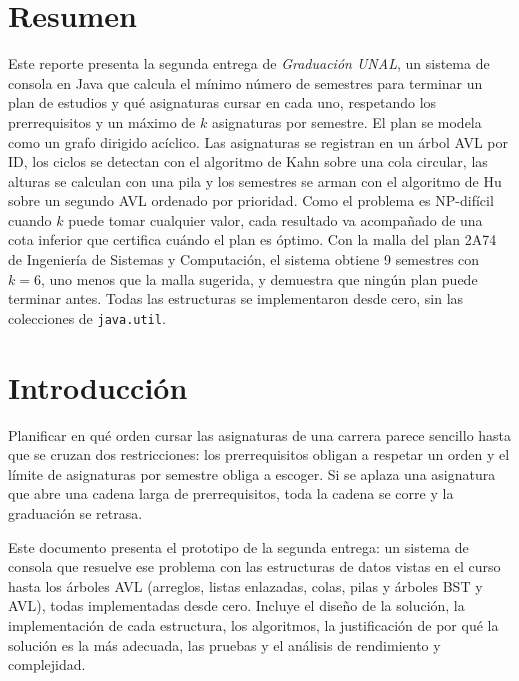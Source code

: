\documentclass[11pt,letterpaper]{article}
\begin{document}
\section*{Resumen}
Este reporte presenta la segunda entrega de \emph{Graduación UNAL}, un sistema de consola en Java que calcula el mínimo número de semestres para terminar un plan de estudios y qué asignaturas cursar en cada uno, respetando los prerrequisitos y un máximo de $k$ asignaturas por semestre. El plan se modela como un grafo dirigido acíclico. Las asignaturas se registran en un árbol AVL por ID, los ciclos se detectan con el algoritmo de Kahn sobre una cola circular, las alturas se calculan con una pila y los semestres se arman con el algoritmo de Hu sobre un segundo AVL ordenado por prioridad. Como el problema es NP-difícil cuando $k$ puede tomar cualquier valor, cada resultado va acompañado de una cota inferior que certifica cuándo el plan es óptimo. Con la malla del plan 2A74 de Ingeniería de Sistemas y Computación, el sistema obtiene 9 semestres con $k = 6$, uno menos que la malla sugerida, y demuestra que ningún plan puede terminar antes. Todas las estructuras se implementaron desde cero, sin las colecciones de \texttt{java.util}.

\vspace{0.4cm}
\tableofcontents
\newpage

\section{Introducción}\label{sec:introduccion}

Planificar en qué orden cursar las asignaturas de una carrera parece sencillo hasta que se cruzan dos restricciones: los prerrequisitos obligan a respetar un orden y el límite de asignaturas por semestre obliga a escoger. Si se aplaza una asignatura que abre una cadena larga de prerrequisitos, toda la cadena se corre y la graduación se retrasa.

Este documento presenta el prototipo de la segunda entrega: un sistema de consola que resuelve ese problema con las estructuras de datos vistas en el curso hasta los árboles AVL (arreglos, listas enlazadas, colas, pilas y árboles BST y AVL), todas implementadas desde cero. Incluye el diseño de la solución, la implementación de cada estructura, los algoritmos, la justificación de por qué la solución es la más adecuada, las pruebas y el análisis de rendimiento y complejidad.
\end{document}
